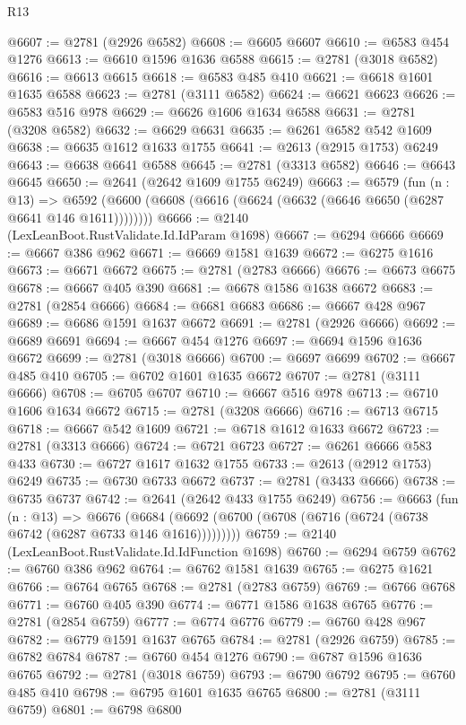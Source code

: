 \begin{lexlean}{R13}
\begin{coremodule}
@6607 := @2781 (@2926 @6582)
@6608 := @6605 @6607
@6610 := @6583 @454 @1276
@6613 := @6610 @1596 @1636 @6588
@6615 := @2781 (@3018 @6582)
@6616 := @6613 @6615
@6618 := @6583 @485 @410
@6621 := @6618 @1601 @1635 @6588
@6623 := @2781 (@3111 @6582)
@6624 := @6621 @6623
@6626 := @6583 @516 @978
@6629 := @6626 @1606 @1634 @6588
@6631 := @2781 (@3208 @6582)
@6632 := @6629 @6631
@6635 := @6261 @6582 @542 @1609
@6638 := @6635 @1612 @1633 @1755
@6641 := @2613 (@2915 @1753) @6249
@6643 := @6638 @6641 @6588
@6645 := @2781 (@3313 @6582)
@6646 := @6643 @6645
@6650 := @2641 (@2642 @1609 @1755 @6249)
@6663 := @6579
    (fun (n : @13) =>
    @6592 (@6600 (@6608 (@6616 (@6624 (@6632 (@6646 @6650 (@6287 @6641 @146 @1611))))))))
@6666 := @2140 (LexLeanBoot.RustValidate.Id.IdParam @1698)
@6667 := @6294 @6666
@6669 := @6667 @386 @962
@6671 := @6669 @1581 @1639
@6672 := @6275 @1616
@6673 := @6671 @6672
@6675 := @2781 (@2783 @6666)
@6676 := @6673 @6675
@6678 := @6667 @405 @390
@6681 := @6678 @1586 @1638 @6672
@6683 := @2781 (@2854 @6666)
@6684 := @6681 @6683
@6686 := @6667 @428 @967
@6689 := @6686 @1591 @1637 @6672
@6691 := @2781 (@2926 @6666)
@6692 := @6689 @6691
@6694 := @6667 @454 @1276
@6697 := @6694 @1596 @1636 @6672
@6699 := @2781 (@3018 @6666)
@6700 := @6697 @6699
@6702 := @6667 @485 @410
@6705 := @6702 @1601 @1635 @6672
@6707 := @2781 (@3111 @6666)
@6708 := @6705 @6707
@6710 := @6667 @516 @978
@6713 := @6710 @1606 @1634 @6672
@6715 := @2781 (@3208 @6666)
@6716 := @6713 @6715
@6718 := @6667 @542 @1609
@6721 := @6718 @1612 @1633 @6672
@6723 := @2781 (@3313 @6666)
@6724 := @6721 @6723
@6727 := @6261 @6666 @583 @433
@6730 := @6727 @1617 @1632 @1755
@6733 := @2613 (@2912 @1753) @6249
@6735 := @6730 @6733 @6672
@6737 := @2781 (@3433 @6666)
@6738 := @6735 @6737
@6742 := @2641 (@2642 @433 @1755 @6249)
@6756 := @6663
    (fun (n : @13) =>
    @6676 (@6684 (@6692 (@6700 (@6708 (@6716 (@6724 (@6738 @6742 (@6287 @6733 @146 @1616)))))))))
@6759 := @2140 (LexLeanBoot.RustValidate.Id.IdFunction @1698)
@6760 := @6294 @6759
@6762 := @6760 @386 @962
@6764 := @6762 @1581 @1639
@6765 := @6275 @1621
@6766 := @6764 @6765
@6768 := @2781 (@2783 @6759)
@6769 := @6766 @6768
@6771 := @6760 @405 @390
@6774 := @6771 @1586 @1638 @6765
@6776 := @2781 (@2854 @6759)
@6777 := @6774 @6776
@6779 := @6760 @428 @967
@6782 := @6779 @1591 @1637 @6765
@6784 := @2781 (@2926 @6759)
@6785 := @6782 @6784
@6787 := @6760 @454 @1276
@6790 := @6787 @1596 @1636 @6765
@6792 := @2781 (@3018 @6759)
@6793 := @6790 @6792
@6795 := @6760 @485 @410
@6798 := @6795 @1601 @1635 @6765
@6800 := @2781 (@3111 @6759)
@6801 := @6798 @6800

\end{coremodule}
\end{lexlean}
